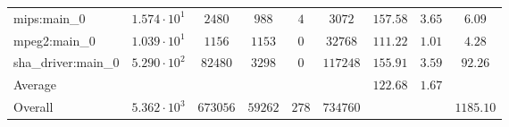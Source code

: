 \begin{tabular}{|l|c|c|c|c|c|c|c|c|}
mips:main\_0            & $ 1.574 \cdot 10^{1}  $ & $ 2480   $ & $ 988   $ & $ 4   $ & $ 3072   $ & $ 157.58      $ & $ 3.65    $ & $ 6.09    $ \\
mpeg2:main\_0           & $ 1.039 \cdot 10^{1}  $ & $ 1156   $ & $ 1153  $ & $ 0   $ & $ 32768  $ & $ 111.22      $ & $ 1.01    $ & $ 4.28    $ \\
sha\_driver:main\_0     & $ 5.290 \cdot 10^{2}  $ & $ 82480  $ & $ 3298  $ & $ 0   $ & $ 117248 $ & $ 155.91      $ & $ 3.59    $ & $ 92.26   $ \\
\hline
Average                 & $                     $ & $        $ & $       $ & $     $ & $        $ & $ 122.68      $ & $ 1.67    $ & $         $ \\
\hline
Overall                 & $ 5.362 \cdot 10^{3}  $ & $ 673056 $ & $ 59262 $ & $ 278 $ & $ 734760 $ & $             $ & $         $ & $ 1185.10 $ \\
\hline
\end{tabular}
